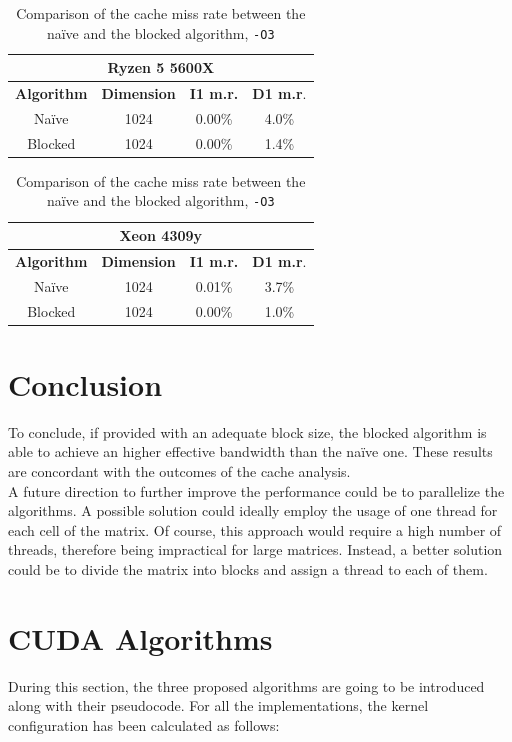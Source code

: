 \documentclass{IEEEconf}
\begin{document}
\begin{table}[h]
    \centering
    \begin{tabular}{|c|c|c|c|}
        \hline
        \multicolumn{4}{|c|}{\textbf{Ryzen 5 5600X}} \\ 
        \hline
        \textbf{Algorithm} & \textbf{Dimension} & \textbf{I1 m.r.} & \textbf{D1 m.r}. \\ \hline
        Na\"{i}ve & 1024        & 0.00\%       & 4.0\%        \\ \hline
        Blocked  & 1024        & 0.00\%       & 1.4\%        \\ \hline
    \end{tabular}
    \hspace{2em}
    \begin{tabular}{|c|c|c|c|}
        \hline
        \multicolumn{4}{|c|}{\textbf{Xeon 4309y}} \\ 
        \hline
        \textbf{Algorithm} & \textbf{Dimension} & \textbf{I1 m.r.} & \textbf{D1 m.r}. \\ \hline
        Na\"{i}ve & 1024        & 0.01\%       & 3.7\%        \\ \hline
        Blocked  & 1024        & 0.00\%       & 1.0\%        \\ \hline
    \end{tabular}
    \caption{Comparison of the cache miss rate between the na\"{i}ve and the blocked algorithm, \texttt{-O3}}
    \label{tab:blocked_cache_miss}
\end{table}
\section{Conclusion}
To conclude, if provided with an adequate block size, the blocked algorithm is able to achieve an higher effective bandwidth than the na\"{i}ve one.
These results are concordant with the outcomes of the cache analysis. \\
A future direction to further improve the performance could be to parallelize the algorithms. A possible solution could ideally employ the usage of one thread 
for each cell of the matrix. Of course, this approach would require a high number of threads, therefore being impractical for large matrices. Instead, a better solution 
could be to divide the matrix into blocks and assign a thread to each of them.
\newpage
{}
\newpage
\section{CUDA Algorithms} \label{algorithms}
During this section, the three proposed algorithms are going to be introduced along with their pseudocode.
For all the implementations, the kernel configuration has been calculated as follows: \\
\end{document}
